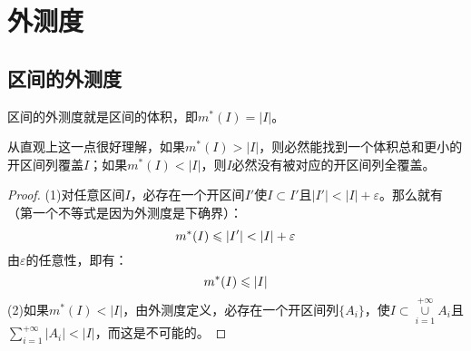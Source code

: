 \section{外测度}

\subsection{区间的外测度}
\begin{theorem}
	区间的外测度就是区间的体积，即$m^*(I)=|I|$。
\end{theorem}
从直观上这一点很好理解，如果$m^*(I)>|I|$，则必然能找到一个体积总和更小的开区间列覆盖$I$；如果$m^*(I)<|I|$，则$I$必然没有被对应的开区间列全覆盖。
\begin{proof}
	(1)对任意区间$I$，必存在一个开区间$I'$使$I\subset I'$且$|I'|<|I|+\varepsilon$。那么就有（第一个不等式是因为外测度是下确界）：
	\begin{equation}
		m^*(I)\leqslant|I'|<|I|+\varepsilon\notag
	\end{equation}
	由$\varepsilon$的任意性，即有：
	\begin{equation}
		m^*(I)\leqslant|I|\notag
	\end{equation}
	(2)如果$m^*(I)<|I|$，由外测度定义，必存在一个开区间列$\{A_i\}$，使$I\subset\underset{i=1}{\overset{+\infty}{\cup}}A_i$且$\sum\limits_{i=1}^{+\infty}|A_i|<|I|$，而这是不可能的。
\end{proof}












